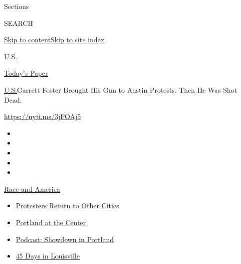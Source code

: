 Sections

SEARCH

\protect\hyperlink{site-content}{Skip to
content}\protect\hyperlink{site-index}{Skip to site index}

\href{https://www.nytimes3xbfgragh.onion/section/us}{U.S.}

\href{https://myaccount.nytimes3xbfgragh.onion/auth/login?response_type=cookie\&client_id=vi}{}

\href{https://www.nytimes3xbfgragh.onion/section/todayspaper}{Today's
Paper}

\href{/section/us}{U.S.}\textbar{}Garrett Foster Brought His Gun to
Austin Protests. Then He Was Shot Dead.

\url{https://nyti.ms/3jFOAj5}

\begin{itemize}
\item
\item
\item
\item
\item
\end{itemize}

\href{https://www.nytimes3xbfgragh.onion/news-event/george-floyd-protests-minneapolis-new-york-los-angeles?action=click\&pgtype=Article\&state=default\&region=TOP_BANNER\&context=storylines_menu}{Race
and America}

\begin{itemize}
\tightlist
\item
  \href{https://www.nytimes3xbfgragh.onion/2020/07/26/us/protests-portland-seattle-trump.html?action=click\&pgtype=Article\&state=default\&region=TOP_BANNER\&context=storylines_menu}{Protesters
  Return to Other Cities}
\item
  \href{https://www.nytimes3xbfgragh.onion/2020/07/24/us/portland-oregon-protests-white-race.html?action=click\&pgtype=Article\&state=default\&region=TOP_BANNER\&context=storylines_menu}{Portland
  at the Center}
\item
  \href{https://www.nytimes3xbfgragh.onion/2020/07/23/podcasts/the-daily/portland-protests.html?action=click\&pgtype=Article\&state=default\&region=TOP_BANNER\&context=storylines_menu}{Podcast:
  Showdown in Portland}
\item
  \href{https://www.nytimes3xbfgragh.onion/interactive/2020/07/16/us/black-lives-matter-protests-louisville-breonna-taylor.html?action=click\&pgtype=Article\&state=default\&region=TOP_BANNER\&context=storylines_menu}{45
  Days in Louisville}
\end{itemize}

